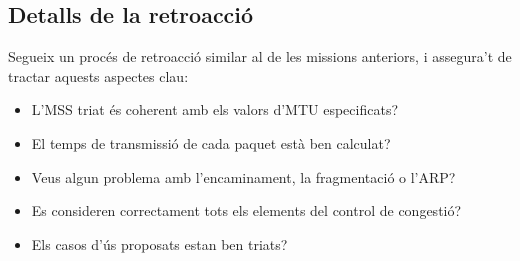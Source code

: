 \vspace{-0.25cm}

\subsection*{Detalls de la retroacció}

Segueix un procés de retroacció similar al de les missions anteriors, i assegura't de tractar aquests aspectes clau:
\begin{itemize}
\item L'MSS triat és coherent amb els valors d'MTU especificats?
\item El temps de transmissió de cada paquet està ben calculat?
\item Veus algun problema amb l'encaminament, la fragmentació o l'ARP?
\item Es consideren correctament tots els elements del control de congestió?
\item Els casos d'ús proposats estan ben triats?
\end{itemize}
